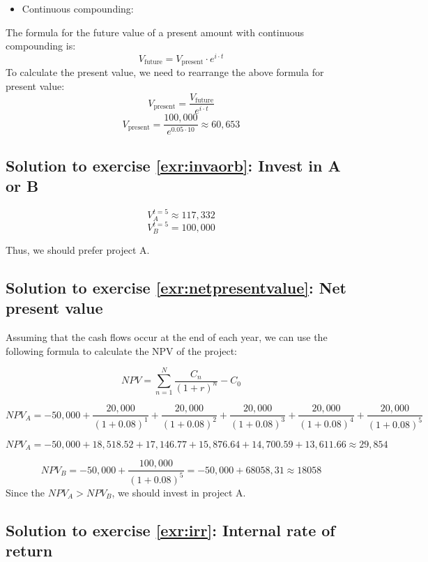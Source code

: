 \documentclass[
  12pt,
  oneside]{book}
\providecommand{\tightlist}{%
  \setlength{\itemsep}{0pt}\setlength{\parskip}{0pt}}
\theoremstyle{definition}
\theoremstyle{definition}
\theoremstyle{definition}
\theoremstyle{definition}
\theoremstyle{remark}
\begin{document}
\begin{itemize}
\tightlist
\item
  Continuous compounding:
\end{itemize}

The formula for the future value of a present amount with continuous compounding is:
\[
V_{\text{future}} = V_{\text{present}} \cdot e^{i \cdot t}
\]
To calculate the present value, we need to rearrange the above formula for present value:
\[
V_{\text{present}}  = \frac{V_{\text{future}}}{e^{i\cdot t}}
\]
\[
V_{\text{present}} = \frac{100,000}{e^{0.05 \cdot 10}} \approx 60,653
\]

\hypertarget{sol:invaorb}{%
\subsection*{Solution to exercise \ref{exr:invaorb}: Invest in A or B}\label{sol:invaorb}}

\[
V_{A}^{t=5}\approx 117,332
\]
\[
V_{B}^{t=5}= 100,000
\]

Thus, we should prefer project A.

\hypertarget{sol:netpresentvalue}{%
\subsection*{Solution to exercise \ref{exr:netpresentvalue}: Net present value}\label{sol:netpresentvalue}}

Assuming that the cash flows occur at the end of each year, we can use the following formula to calculate the NPV of the project:

\[ 
NPV = \sum_{n=1}^{N} \frac{C_n}{(1+r)^n} - C_0 
\]

\[
NPV_A = -50,000 + \frac{20,000}{(1 + 0.08)^1} + 
    \frac{20,000 }{ (1 + 0.08)^2} + 
        \frac{20,000 }{ (1 + 0.08)^3} + 
            \frac{20,000 }{ (1 + 0.08)^4} + 
                \frac{20,000 }{ (1 + 0.08)^5}
\]

\[
NPV_A = -50,000 + 18,518.52 + 17,146.77 + 15,876.64 + 14,700.59 + 13,611.66 \approx 29,854
\]

\[
NPV_B = -50,000 + \frac{100,000 }{ (1 + 0.08)^5} = -50,000+68058,31\approx 18058
\]
Since the \(NPV_A>NPV_B\), we should invest in project A.

\hypertarget{sol:irr}{%
\subsection*{Solution to exercise \ref{exr:irr}: Internal rate of return}\label{sol:irr}}
\end{document}
